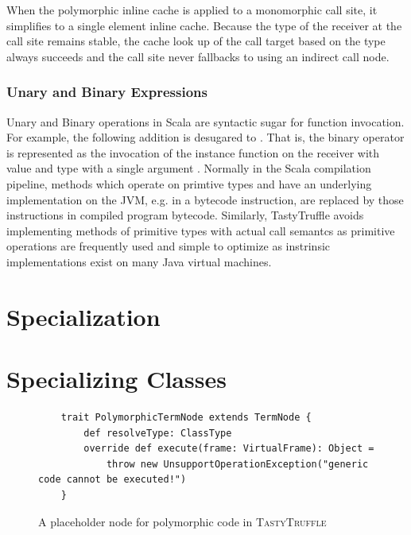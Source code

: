When the polymorphic inline cache is applied to a monomorphic call site, it simplifies to a single element inline cache\cite{smalltalk:inline-caches}. 
Because the type of the receiver at the call site remains stable, the cache look up of the call target based on the type always succeeds and the call site never fallbacks to using an indirect call node.


\subsubsection*{Unary and Binary Expressions}

Unary and Binary operations in Scala are syntactic sugar for function invocation. 
For example, the following addition  is desugared to . 
That is, the binary operator \scalainline{+} is represented as the invocation of the instance function  on the receiver with value  and type  with a single argument .
Normally in the Scala compilation pipeline, methods which operate on primtive types and have an underlying implementation on the JVM\cite{java:vm-spec}, e.g. in a bytecode instruction, are replaced by those instructions in compiled program bytecode. 
Similarly, TastyTruffle avoids implementing methods of primitive types with actual call semantcs as primitive operations are frequently used and simple to optimize as instrinsic implementations exist on many Java virtual machines.\cite{???}

\section{Specialization}
\label{implementation:specialization}

\section{Specializing Classes}

\begin{figure}[H]
	\begin{verbatim}
	trait PolymorphicTermNode extends TermNode {
		def resolveType: ClassType 
		override def execute(frame: VirtualFrame): Object = 
			throw new UnsupportOperationException("generic code cannot be executed!")
	}
	\end{verbatim}
	\caption{A placeholder node for polymorphic code in \textsc{TastyTruffle}}
\end{figure}


